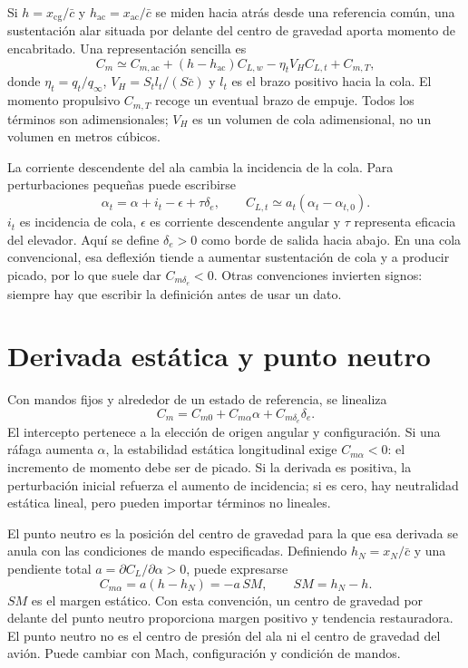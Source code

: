 Si $h=x_{\mathrm{cg}}/\bar c$ y $h_{\mathrm{ac}}=x_{\mathrm{ac}}/\bar c$ se miden hacia atrás desde una referencia común, una sustentación alar situada por delante del centro de gravedad aporta momento de encabritado. Una representación sencilla es
\begin{equation}\label{eq:12-tail}
C_m\simeq C_{m,\mathrm{ac}}+(h-h_{\mathrm{ac}})C_{L,w}
-\eta_t V_H C_{L,t}+C_{m,T},
\end{equation}
donde $\eta_t=q_t/q_\infty$, $V_H=S_tl_t/(S\bar c)$ y $l_t$ es el brazo positivo hacia la cola. El momento propulsivo $C_{m,T}$ recoge un eventual brazo de empuje. Todos los términos son adimensionales; $V_H$ es un volumen de cola adimensional, no un volumen en metros cúbicos.

La corriente descendente del ala cambia la incidencia de la cola. Para perturbaciones pequeñas puede escribirse
\begin{equation}
\alpha_t=\alpha+i_t-\epsilon+\tau\delta_e,\qquad
C_{L,t}\simeq a_t(\alpha_t-\alpha_{t,0}).
\end{equation}
$i_t$ es incidencia de cola, $\epsilon$ es corriente descendente angular y $\tau$ representa eficacia del elevador. Aquí se define $\delta_e>0$ como borde de salida hacia abajo. En una cola convencional, esa deflexión tiende a aumentar sustentación de cola y a producir picado, por lo que suele dar $C_{m\delta_e}<0$. Otras convenciones invierten signos: siempre hay que escribir la definición antes de usar un dato.

\section{Derivada estática y punto neutro}
Con mandos fijos y alrededor de un estado de referencia, se linealiza
\begin{equation}\label{eq:12-linear}
C_m=C_{m0}+C_{m\alpha}\alpha+C_{m\delta_e}\delta_e.
\end{equation}
El intercepto pertenece a la elección de origen angular y configuración. Si una ráfaga aumenta $\alpha$, la estabilidad estática longitudinal exige $C_{m\alpha}<0$: el incremento de momento debe ser de picado. Si la derivada es positiva, la perturbación inicial refuerza el aumento de incidencia; si es cero, hay neutralidad estática lineal, pero pueden importar términos no lineales.

El punto neutro es la posición del centro de gravedad para la que esa derivada se anula con las condiciones de mando especificadas. Definiendo $h_N=x_N/\bar c$ y una pendiente total $a=\partial C_L/\partial\alpha>0$, puede expresarse
\begin{equation}\label{eq:12-sm}
C_{m\alpha}=a(h-h_N)=-a\,SM,\qquad SM=h_N-h.
\end{equation}
$SM$ es el margen estático. Con esta convención, un centro de gravedad por delante del punto neutro proporciona margen positivo y tendencia restauradora. El punto neutro no es el centro de presión del ala ni el centro de gravedad del avión. Puede cambiar con Mach, configuración y condición de mandos.


